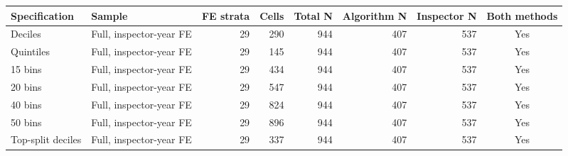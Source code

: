 \begin{tabular}{llrrrrrc}
\toprule
Specification & Sample & FE strata & Cells & Total N & Algorithm N & Inspector N & Both methods \\
\midrule
Deciles & Full, inspector-year FE & 29 & 290 & 944 & 407 & 537 & Yes \\
Quintiles & Full, inspector-year FE & 29 & 145 & 944 & 407 & 537 & Yes \\
15 bins & Full, inspector-year FE & 29 & 434 & 944 & 407 & 537 & Yes \\
20 bins & Full, inspector-year FE & 29 & 547 & 944 & 407 & 537 & Yes \\
40 bins & Full, inspector-year FE & 29 & 824 & 944 & 407 & 537 & Yes \\
50 bins & Full, inspector-year FE & 29 & 896 & 944 & 407 & 537 & Yes \\
Top-split deciles & Full, inspector-year FE & 29 & 337 & 944 & 407 & 537 & Yes \\
\bottomrule
\end{tabular}
